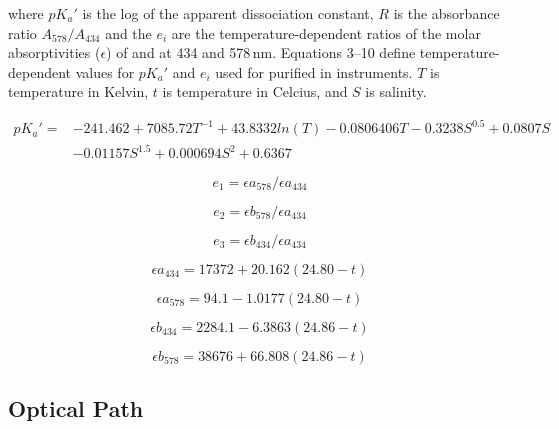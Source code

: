 where ${pK_a}'$ is the log of the apparent dissociation constant, $R$ is the absorbance ratio $A_{578}/A_{434}$ and the $e_i$ are the temperature-dependent ratios of the molar absorptivities ($\epsilon$) of  and  at 434 and 578\,nm. Equations 3--10 define temperature-dependent values for $pK_a$$'$ and $e_i$ used for purified \mCP in \instType{} instruments. $T$ is temperature in Kelvin, $t$ is temperature in Celcius, and $S$ is salinity.

\begin{equation}
\label{eq:pKa}
  \begin{aligned}
 {pK_a}' = &-241.462 + 7085.72T^{-1} + 43.8332ln(T) - 0.0806406T - 0.3238S^{0.5} + 0.0807S\\
           & - 0.01157S^{1.5} + 0.000694S^2 + 0.6367
   \end{aligned}
\end{equation}

\begin{equation}
\label{eq:e1}
e_1 = {\epsilon}a_{578}/{\epsilon}a_{434}
\end{equation}

\begin{equation}
\label{eq:e2}
e_2 = {\epsilon}b_{578}/{\epsilon}a_{434}
\end{equation}

\begin{equation}
\label{eq:e3}
e_3 = {\epsilon}b_{434}/{\epsilon}a_{434}
\end{equation}

\begin{equation}
\label{eq:ea434}
{\epsilon}a_{434} = 17372 + 20.162(24.80 - t)
\end{equation}

\begin{equation}
\label{eq:ea578}
{\epsilon}a_{578} = 94.1 - 1.0177(24.80 - t)
\end{equation}

\begin{equation}
\label{eq:eb434}
{\epsilon}b_{434} = 2284.1 - 6.3863(24.86 - t)
\end{equation}

\begin{equation}
\label{eq:eb578}
{\epsilon}b_{578} = 38676 + 66.808(24.86 - t)
\end{equation}


\subsection{Optical Path}

